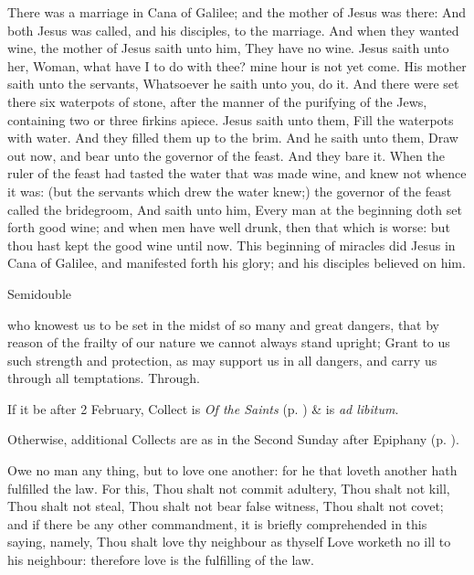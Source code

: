  There was a marriage in Cana of Galilee; and the mother of Jesus was there: And both Jesus was called, and his disciples, to the marriage. And when they wanted wine, the mother of Jesus saith unto him, They have no wine. Jesus saith unto her, Woman, what have I to do with thee? mine hour is not yet come. His mother saith unto the servants, Whatsoever he saith unto you, do it. And there were set there six waterpots of stone, after the manner of the purifying of the Jews, containing two or three firkins apiece. Jesus saith unto them, Fill the waterpots with water. And they filled them up to the brim. And he saith unto them, Draw out now, and bear unto the governor of the feast. And they bare it. When the ruler of the feast had tasted the water that was made wine, and knew not whence it was: (but the servants which drew the water knew;) the governor of the feast called the bridegroom, And saith unto him, Every man at the beginning doth set forth good wine; and when men have well drunk, then that which is worse: but thou hast kept the good wine until now. This beginning of miracles did Jesus in Cana of Galilee, and manifested forth his glory; and his disciples believed on him.


\begin{inhead}
{Semidouble}
\end{inhead}

\collect
 who knowest us to be set in the midst of so many and great dangers, that by reason of the frailty of our nature we cannot always stand upright; Grant to us such strength and protection, as may support us in all dangers, and carry us through all temptations. Through.
\begin{rubric}
    If it be after 2 February,  Collect is \emph{Of the Saints} (p. \pageref{SPSaints}) \&  is \emph{ad libitum}.\par
    Otherwise, additional Collects are as in the Second Sunday after Epiphany (p. \pageref{EpiphanyII}).
\end{rubric}

 Owe no man any thing, but to love one another: for he that loveth another hath fulfilled the law. For this, Thou shalt not commit adultery, Thou shalt not kill, Thou shalt not steal, Thou shalt not bear false witness, Thou shalt not covet; and if there be any other commandment, it is briefly comprehended in this saying, namely, Thou shalt love thy neighbour as thyself Love worketh no ill to his neighbour: therefore love is the fulfilling of the law.

